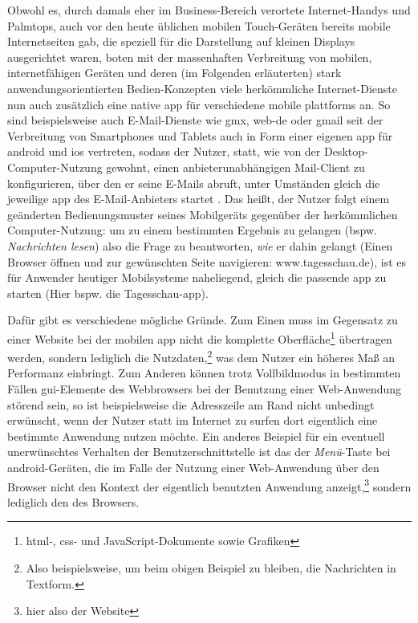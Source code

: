 Obwohl es, durch damals eher im Business-Bereich verortete Internet-Handys und Palmtops, auch vor den heute üblichen mobilen Touch-Geräten bereits mobile Internetseiten gab, die speziell für die Darstellung auf kleinen Displays ausgerichtet waren, boten mit der massenhaften Verbreitung von mobilen, internetfähigen Geräten und deren (im Folgenden erläuterten) stark anwendungsorientierten Bedien-Konzepten viele herkömmliche Internet-Dienste nun auch zusätzlich eine native \gls{app} für verschiedene mobile \glspl{plattform} an.
So sind beispielsweise auch E-Mail-Dienste wie \gls{gmx}, \gls{web-de} oder \gls{gmail} seit der Verbreitung von Smartphones und Tablets auch in Form einer eigenen \gls{app} für \gls{android} und \gls{ios} vertreten, sodass der Nutzer, statt, wie von der Desktop-Computer-Nutzung gewohnt, einen anbieterunabhängigen Mail-Client zu konfigurieren, über den er seine E-Mails abruft, unter Umständen gleich die jeweilige \gls{app} des E-Mail-Anbieters startet \cite{gmx, web.de, gmail}.
Das heißt, der Nutzer folgt einem geänderten Bedienungsmuster seines Mobilgeräts gegenüber der herkömmlichen Computer-Nutzung: um zu einem bestimmten Ergebnis zu gelangen (bspw. \emph{Nachrichten lesen}) also die Frage zu beantworten, \emph{wie} er dahin gelangt (Einen Browser öffnen und zur gewünschten Seite navigieren: www.tagesschau.de), ist es für Anwender heutiger Mobilsysteme naheliegend, gleich die passende \gls{app} zu starten (Hier bspw. die Tagesschau-\gls{app}).

Dafür gibt es verschiedene mögliche Gründe. Zum Einen muss im Gegensatz zu einer Website bei der mobilen \gls{app} nicht die komplette Oberfläche\footnote{\gls{html}-, \gls{css}- und JavaScript-Dokumente sowie Grafiken} übertragen werden, sondern lediglich die Nutzdaten,\footnote{Also beispielsweise, um beim obigen Beispiel zu bleiben, die Nachrichten in Textform.} was dem Nutzer ein höheres Maß an Performanz einbringt.
Zum Anderen können trotz Vollbildmodus in bestimmten Fällen \gls{gui}-Elemente des Webbrowsers bei der Benutzung einer Web-Anwendung störend sein, so ist beispielsweise die Adresszeile am Rand nicht unbedingt erwünscht, wenn der Nutzer statt im Internet zu surfen dort eigentlich eine bestimmte Anwendung nutzen möchte. 
Ein anderes Beispiel für ein eventuell unerwünschtes Verhalten der Benutzerschnittstelle ist das der \emph{Menü}-Taste bei \gls{android}-Geräten, die im Falle der Nutzung einer Web-Anwendung über den Browser nicht den Kontext der eigentlich benutzten Anwendung anzeigt,\footnote{hier also der Website} sondern lediglich den des Browsers.

